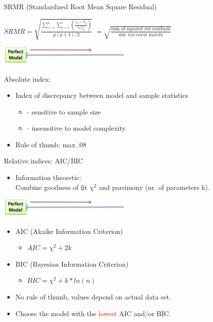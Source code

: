 \documentclass[10pt]{beamer}\usepackage[]{graphicx}\usepackage[]{xcolor}
\begin{document}
\begin{frame}{SRMR (Standardized Root Mean Square Residual)}

$SRMR = \sqrt{\frac{\sum_{i=1}^{p}\sum_{j=1}^{i}(\frac{s_{ij}-\hat{\sigma_{ij}}}{s_{ii}s_{jj}})}{p(p+1)/2}}$ 
$=\sqrt{\frac{\text{sum of squared std residuals}}{\text{size var-covar matrix}}}$

\vspace*{5mm}
\includegraphics[height=1cm,keepaspectratio=T] {perfect_fit.png}
\hfill
\vspace*{5mm}

Absolute index:
\begin{itemize}
  \item {Index of discrepancy between model and sample statistics}
    \begin{itemize}
    \item {\textcolor{red}{-} sensitive to sample size}
    \item {\textcolor{red}{-} insensitive to model complexity}
    \end{itemize}
  \item{Rule of thumb: max .08}
\end{itemize}
\end{frame}
%
\begin{frame}{Relative indices: AIC/BIC}
\begin{itemize}
  \item Information theoretic: \\
  Combine goodness of fit $\chi^2$ and parsimony (nr. of parameters k). 
\end{itemize}

\vspace*{3mm}
\includegraphics[height=1cm,keepaspectratio=T] {perfect_fit.png}
\vspace*{3mm}

\begin{itemize}
  \item {\normalsize AIC (Akaike Information Criterion)}
    \begin{itemize}
    \item{$AIC = \chi^2 + 2k$}
    \end{itemize}
  \item {\normalsize BIC (Bayesian Information Criterion)}
    \begin{itemize}
    \item{$BIC = \chi^2 + k*ln(n)$}
    \end{itemize}
  \item{\normalsize No rule of thumb, values depend on actual data set.}
  \item{\normalsize Choose the model with the \textcolor{red}{lowest} AIC and/or BIC.}
\end{itemize}
\end{frame}
\end{document}
